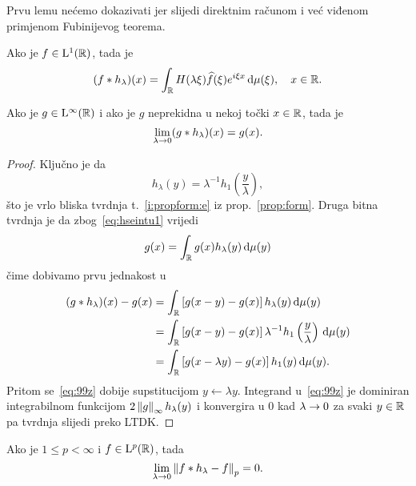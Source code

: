 \documentclass[main.tex]{subfiles}
\begin{document}
Prvu lemu nećemo dokazivati jer slijedi direktnim računom
i već viđenom primjenom Fubinijevog teorema.

\begin{lema}\label{lema:four1}
	Ako je \( f \in \mathrm{L}^1(\mathbb{R}) \), tada je
	\begin{equation}
		(f*h_\lambda)(x) = \int_{\mathbb{R}} H(\lambda \xi)\widehat{f}(\xi) e^{i\xi x} \,\mathrm d \mu(\xi), \quad x \in \mathbb{R}.
	\end{equation}
\end{lema}

\begin{lema}\label{lema:four2}
	Ako je \( g \in \mathrm{L}^\infty(\mathbb{R}) \) i ako je \( g \) neprekidna u nekoj točki \( x \in \mathbb{R} \),
	tada je
	\begin{equation}
		\lim\limits_{\lambda \rightarrow 0} (g * h_\lambda)(x) = g(x).
	\end{equation}
\end{lema}

\begin{proof}
	Ključno je da
	\begin{equation}
		h_\lambda(y) = \lambda^{-1} h_1\left( \frac y\lambda \right),
	\end{equation}
	što je vrlo bliska tvrdnja t.~\ref{i:propform:e} iz prop.~\ref{prop:form}.
	Druga bitna tvrdnja je da zbog~\eqref{eq:hseintu1} vrijedi
	\begin{equation}
		g(x) = \int_{\mathbb{R}} g(x) h_\lambda(y) \,\mathrm d \mu(y)
	\end{equation}
	čime dobivamo prvu jednakost u
	\begin{align}
		(g*h_\lambda)(x) - g(x) & = \int_{\mathbb{R}} \left[ g(x-y) - g(x) \right] h_\lambda(y) \,\mathrm d \mu(y)                                     \\
		                        & = \int_{\mathbb{R}} \left[ g(x-y) - g(x) \right] \lambda^{-1} h_1 \left( \frac y \lambda \right) \,\mathrm d \mu (y) \\
		                        & = \int_{\mathbb{R}} \left[ g(x-\lambda y) - g(x) \right] h_1(y) \,\mathrm d \mu(y). \label{eq:99z}
	\end{align}
	Pritom se~\eqref{eq:99z} dobije supstitucijom \( y \leftarrow \lambda y \).
	Integrand u~\eqref{eq:99z} je dominiran integrabilnom funkcijom
	\( 2\left\lVert g\right\rVert_\infty h_\lambda (y) \) i konvergira u \( 0 \) kad \( \lambda \rightarrow 0 \)
	za svaki \( y \in \mathbb{R} \) pa tvrdnja slijedi preko LTDK.
\end{proof}

\begin{lema}\label{lema:four3}
	Ako je \( 1 \le p < \infty \) i \( f \in \mathrm{L}^p(\mathbb{R}) \), tada
	\begin{equation}
		\lim\limits_{\lambda \rightarrow 0} \left\lVert f*h_\lambda - f\right\rVert_p = 0.
	\end{equation}
\end{lema}
\end{document}
